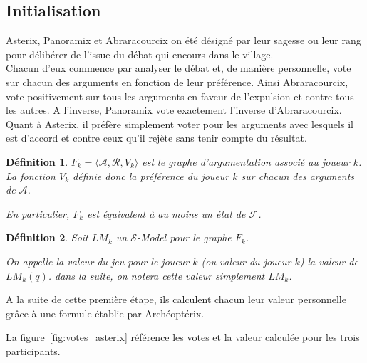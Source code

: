 \documentclass[11pt]{article}
\theoremstyle{defi}
\newtheorem{definition}{Définition}[section]
\theoremstyle{not}
\theoremstyle{prob}
\begin{document}
    \subsection{Initialisation}

      Asterix, Panoramix et Abraracourcix on été désigné par leur sagesse ou leur rang pour délibérer de l'issue du débat qui encours dans le village.\\

      Chacun d'eux commence par analyser le débat et, de manière personnelle, vote sur chacun des arguments en fonction de leur préférence.
      Ainsi Abraracourcix, vote positivement sur tous les arguments en faveur de l'expulsion et contre tous les autres.
      A l'inverse, Panoramix vote exactement l'inverse d'Abraracourcix.
      Quant à Asterix, il préfère simplement voter pour les arguments avec lesquels il est d'accord et contre ceux qu'il rejète sans tenir compte du résultat.

      \begin{definition}
        $F_k = \langle \mathcal{A}, \mathcal{R}, V_k \rangle$ est le graphe d'argumentation associé au joueur $k$.
        La fonction $V_k$ définie donc la préférence du joueur $k$ sur chacun des arguments de $\mathcal{A}$.

        En particulier, $F_k$ est équivalent à au moins un état de $\mathcal{F}$.
      \end{definition}
      \begin{definition}
        Soit $LM_k$ un $\mathcal{S}$-Model pour le graphe $F_k$.

        On appelle la valeur du jeu pour le joueur $k$ (ou valeur du joueur $k$) la valeur de $LM_k(q)$. dans la suite, on notera cette valeur simplement $LM_k$.
      \end{definition}

      A la suite de cette première étape, ils calculent chacun leur valeur personnelle grâce à une formule établie par Archéoptérix.

      La figure~\ref{fig:votes_asterix} référence les votes et la valeur calculée pour les trois participants.
\end{document}
